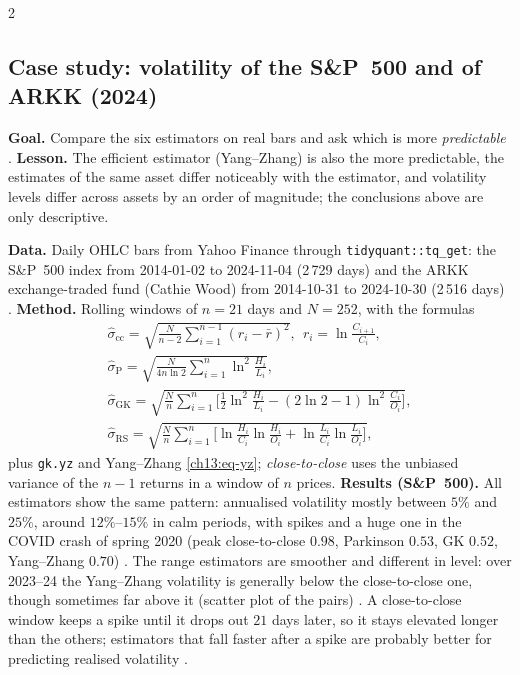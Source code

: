 \begin{paracol}{2}
\subsection{Case study: volatility of the S\&P~500 and of ARKK (2024)}\label{ch13:sec-gkcs}
\begin{casestudy}\label{ch13:cs-ohlc}
\textbf{Goal.} Compare the six estimators on real bars and ask which is more \emph{predictable}
.
\textbf{Lesson.} The efficient estimator (Yang--Zhang) is also the more predictable, the estimates of the same asset differ noticeably with the
estimator, and volatility levels differ across assets by an order of magnitude; the conclusions above are only descriptive.
\end{casestudy}
\begin{secondary}
\textbf{Data.} Daily OHLC bars from Yahoo Finance through \texttt{tidyquant::tq\_get}:
the S\&P~500 index from 2014-01-02 to 2024-11-04 (2\,729 days) and the ARKK exchange-traded fund (Cathie Wood) from 2014-10-31 to 2024-10-30
(2\,516 days) . \textbf{Method.} Rolling windows of $n=21$ days and $N=252$, with the formulas
\begin{gather*}
  \hat\sigma_{\mathrm{cc}}=\sqrt{\tfrac N{n-2}\textstyle\sum_{i=1}^{n-1}(r_i-\bar r)^2},\ \ r_i=\ln\tfrac{C_{i+1}}{C_i},\\
  \hat\sigma_{\mathrm{P}}=\sqrt{\tfrac N{4n\ln2}\textstyle\sum_{i=1}^n\ln^2\tfrac{H_i}{L_i}},\\
  \hat\sigma_{\mathrm{GK}}=\sqrt{\tfrac Nn\textstyle\sum_{i=1}^n\bigl[\tfrac12\ln^2\tfrac{H_i}{L_i}-(2\ln2-1)\ln^2\tfrac{C_i}{O_i}\bigr]},\\
  \hat\sigma_{\mathrm{RS}}=\sqrt{\tfrac Nn\textstyle\sum_{i=1}^n\bigl[\ln\tfrac{H_i}{C_i}\ln\tfrac{H_i}{O_i}+\ln\tfrac{L_i}{C_i}\ln\tfrac{L_i}{O_i}\bigr]},
\end{gather*}
plus \texttt{gk.yz} and Yang--Zhang \eqref{ch13:eq-yz}; \emph{close-to-close} uses the unbiased variance of the $n-1$ returns in a window of $n$ prices.
\textbf{Results (S\&P~500).} All estimators show the same pattern: annualised volatility mostly between $5\%$ and $25\%$, around $12\%$--$15\%$ in
calm periods, with spikes and a huge one in the COVID crash of spring 2020 (peak close-to-close $0.98$, Parkinson $0.53$, GK $0.52$, Yang--Zhang $0.70$)
. The range estimators are smoother and different in level: over 2023--24 the Yang--Zhang volatility
is generally below the close-to-close one, though sometimes far above it (scatter plot of the pairs) . A close-to-close
window keeps a spike until it drops out $21$ days later, so it stays elevated longer than the others; estimators that fall faster after a spike
are probably better for predicting realised volatility .


\end{secondary}
\end{paracol}
